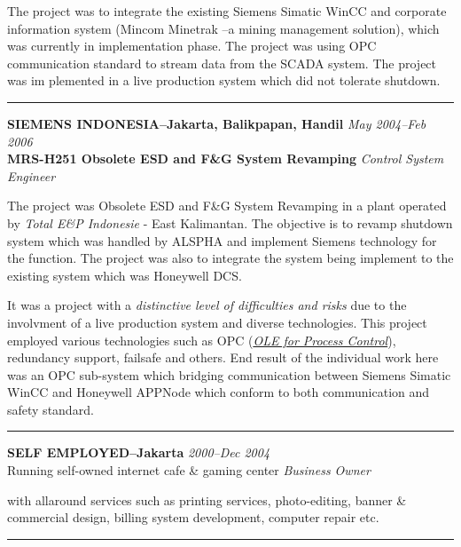 \documentclass[12pt]{res} %
\begin{document}
\begin{resume}
\vspace{-10pt} 
The project was to integrate the existing Siemens Simatic WinCC and corporate information system 
(Mincom Minetrak --a mining management solution), which was currently in implementation phase. The
project was using OPC communication standard to stream data from the SCADA system. The
project was im plemented in a live production system which did not tolerate shutdown.
\begin{center}
	\rule{0.5\textwidth}{.2pt}
\end{center}

{\bf \uppercase{SIEMENS INDONESIA}--Jakarta, Balikpapan, Handil} \hfill {\sl May 2004--Feb 2006} \\
{\bf MRS-H251 Obsolete ESD and F\&G System Revamping} \hfill {\sl Control System Engineer}

\vspace{-10pt} 
The project was Obsolete ESD and F\&G System Revamping in a plant operated by \textit{Total E\&P
Indonesie} - East Kalimantan. The objective is to revamp shutdown system which was handled by
ALSPHA and implement Siemens technology for the function. The project was also to integrate the
system being implement to the existing system which was Honeywell DCS.

It was a project with a \emph{distinctive level of difficulties and risks} due to the involvment of a live
production system and diverse technologies. This project employed various technologies such as OPC (\textit{\href{https://opcfoundation.org}{OLE for Process Control}}), redundancy
support, failsafe and others. End result of the individual work here was an OPC sub-system which
bridging communication between Siemens Simatic WinCC and Honeywell APPNode which conform
to both communication and safety standard.
\begin{center}
	\rule{0.5\textwidth}{.2pt}
\end{center}

{\bf \uppercase{SELF EMPLOYED}--Jakarta} \hfill {\sl 2000--Dec 2004} \\
Running self-owned internet cafe \& gaming center \hfill {\sl Business Owner}
\vspace{-10pt} 

with allaround services such as printing services, photo-editing, banner \& commercial design, billing system development, computer repair etc.

\begin{center}
	\rule{0.5\textwidth}{1pt}
\end{center}


\end{resume}
\end{document}
